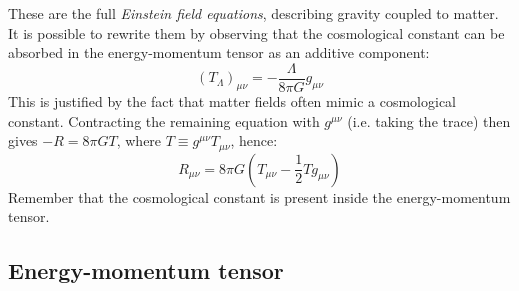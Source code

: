 These are the full \textit{Einstein field equations}, describing gravity coupled to matter. It is possible to rewrite them by observing that the cosmological constant can be absorbed in the energy-momentum tensor as an additive component:
\begin{equation*}
  (T_\Lambda)_{\mu \nu} = - \frac{\Lambda}{8\pi G} g_{\mu \nu}
\end{equation*}
This is justified by the fact that matter fields often mimic a cosmological constant. Contracting the remaining equation with $ g^{\mu \nu} $ (i.e. taking the trace) then gives $ -R = 8\pi G T $, where $ T \equiv g^{\mu \nu} T_{\mu \nu} $, hence:
\begin{equation}
  R_{\mu \nu} = 8\pi G \left( T_{\mu \nu} - \frac{1}{2} T g_{\mu \nu} \right)
  \label{eq:4.42}
\end{equation}
Remember that the cosmological constant is present inside the energy-momentum tensor.

\subsection{Energy-momentum tensor}

